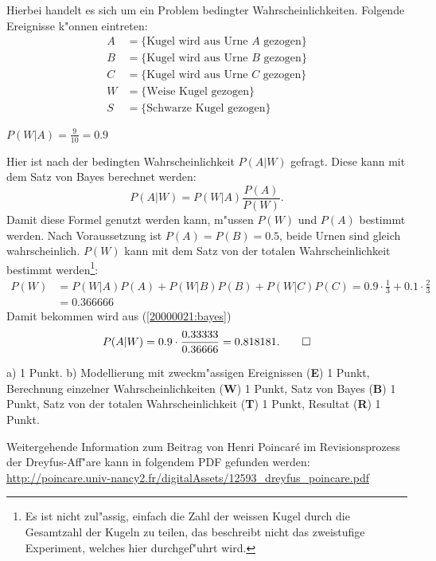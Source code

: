 \begin{loesung}
Hierbei handelt es sich um ein Problem bedingter Wahrscheinlichkeiten.
Folgende Ereignisse k"onnen eintreten:
\begin{align*}
A&=\{\text{Kugel wird aus Urne $A$ gezogen}\}\\
B&=\{\text{Kugel wird aus Urne $B$ gezogen}\}\\
C&=\{\text{Kugel wird aus Urne $C$ gezogen}\}\\
W&=\{\text{Weise Kugel gezogen}\}\\
S&=\{\text{Schwarze Kugel gezogen}\}
\end{align*}
\begin{teilaufgaben}
\item $P(W|A)=\frac{9}{10}= 0.9$
\item Hier ist nach der bedingten Wahrscheinlichkeit $P(A|W)$ gefragt.
Diese kann mit dem Satz von Bayes berechnet werden:
\begin{equation}
P(A|W)=P(W|A)\frac{P(A)}{P(W)}.
\label{20000021:bayes}
\end{equation}
Damit diese Formel genutzt werden kann, m"ussen $P(W)$ und $P(A)$
bestimmt werden.
Nach Voraussetzung ist $P(A)=P(B)=0.5$, beide Urnen sind gleich
wahrscheinlich. $P(W)$ kann mit dem Satz von der totalen
Wahrscheinlichkeit bestimmt werden\footnote{Es ist nicht zul"assig,
einfach die Zahl der weissen Kugel durch die Gesamtzahl der Kugeln
zu teilen, das beschreibt nicht das zweistufige Experiment, welches hier
durchgef"uhrt wird.}:
\begin{align*}
P(W)&=P(W|A)P(A)+P(W|B)P(B)+P(W|C)P(C)
     =0.9\cdot \frac13+0.1\cdot \frac23
\\
    &=0.366666
\end{align*}
Damit bekommen wird aus
(\ref{20000021:bayes})
\[
P(A|W)=0.9\cdot\frac{0.33333}{0.36666}=0.818181.
\qedhere
\]
\end{teilaufgaben}
\end{loesung}

\begin{bewertung}
a) 1 Punkt.
b) Modellierung mit zweckm"assigen Ereignissen ({\bf E}) 1 Punkt,
Berechnung einzelner Wahrscheinlichkeiten ({\bf W}) 1 Punkt,
Satz von Bayes ({\bf B}) 1 Punkt,
Satz von der totalen Wahrscheinlichkeit ({\bf T}) 1 Punkt,
Resultat ({\bf R}) 1 Punkt.
\end{bewertung}

\begin{diskussion}
Weitergehende Information zum Beitrag von Henri Poincar\'e im Revisionsprozess
der Dreyfus-Aff"are kann in folgendem PDF gefunden werden:
\url{http://poincare.univ-nancy2.fr/digitalAssets/12593_dreyfus_poincare.pdf}
\end{diskussion}



